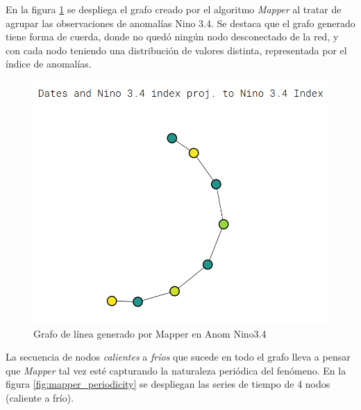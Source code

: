 \documentclass{article}
\begin{document}
            En la figura \ref{fig:mapper_graph} se despliega el grafo creado por el algoritmo \textit{Mapper} al tratar de agrupar las observaciones de anomalías Nino 3.4. Se destaca que el grafo generado tiene forma de cuerda, donde no quedó ningún nodo desconectado de la red, y con cada nodo teniendo una distribución de valores distinta, representada por el índice de anomalías.
            \begin{figure}[!htbp]
                \centering
                \includegraphics[scale=0.5]{mapper_full_anom_nino34_chord.png}
                \caption{Grafo de línea generado por Mapper en Anom Nino3.4}
                \label{fig:mapper_graph}
            \end{figure}

            La secuencia de nodos \textit{calientes} a \textit{fríos} que sucede en todo el grafo lleva a pensar que \textit{Mapper} tal vez esté capturando la naturaleza periódica del fenómeno. En la figura \ref{fig:mapper_periodicity} se despliegan las series de tiempo de 4 nodos (caliente a frío).
\end{document}
